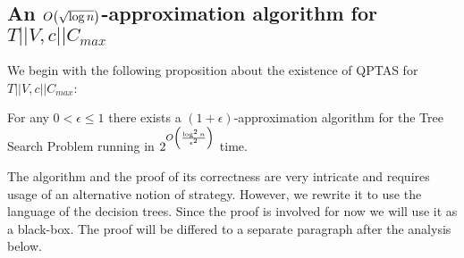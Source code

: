 \subsection{An $O\mathopen{}\left( \sqrt{\log n} \right)$-approximation algorithm for $T||V,c||C_{max}$}
We begin with the following proposition \cite{dereniowski2017ApproxSsForGeneralBSinWTs} about the existence of QPTAS for $T||V,c||C_{max}$:
\begin{proposition}\label{QPTAS}
     For any $0 < \epsilon \leq 1$ there exists a $(1+\epsilon)$-approximation algorithm for the Tree Search Problem running in $2^{O\mathopen{}\left( \frac{\log^2n}{\epsilon^2} \right)}$ time.
\end{proposition}
The algorithm and the proof of its correctness are very intricate and requires usage of an alternative notion of strategy. However, we rewrite it to use the language of the decision trees. Since the proof is involved for now we will use it as a black-box. The proof will be differed to a separate paragraph after the analysis below.


